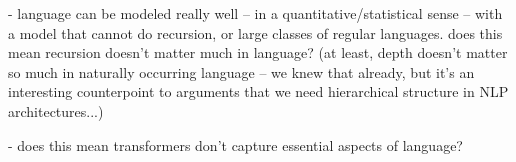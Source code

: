 \documentclass[11pt,a4paper]{article}
\begin{document}
- language can be modeled really well -- in a quantitative/statistical sense -- with a model that cannot do recursion, or large classes of regular languages. does this mean recursion doesn't matter much in language? (at least, depth doesn't matter so much in naturally occurring language -- we knew that already, but it's an interesting counterpoint to arguments that we need hierarchical structure in NLP architectures...)

- does this mean transformers don't capture essential aspects of language?





\end{document}
